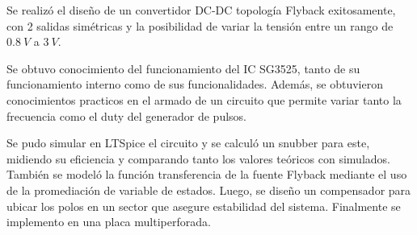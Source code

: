 Se realizó el diseño de un convertidor DC-DC topología Flyback exitosamente, con 2 salidas simétricas y la posibilidad de variar la tensión entre un rango de $0.8 \ V$ a $3 \ V$.

Se obtuvo conocimiento del funcionamiento del IC SG3525, tanto de su funcionamiento interno como de sus funcionalidades. Además, se obtuvieron conocimientos practicos en el armado de un circuito que permite variar tanto la frecuencia como el duty del generador de pulsos. 

Se pudo simular en LTSpice el circuito y se calculó un snubber para este, midiendo su eficiencia y comparando tanto los valores teóricos con simulados. También se modeló la función transferencia de la fuente Flyback mediante el uso de la promediación de variable de estados. Luego, se diseño un compensador para ubicar los polos en un sector que asegure estabilidad del sistema. Finalmente se implemento en una placa multiperforada. 
